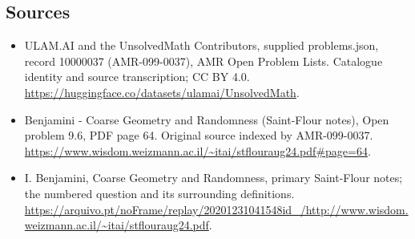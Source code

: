 \documentclass[11pt,a4paper]{article}
\begin{document}
\subsection{Sources}
\begin{itemize}
\item[S1] ULAM.AI and the UnsolvedMath Contributors, supplied problems.json, record 10000037 (AMR-099-0037), AMR Open Problem Lists. Catalogue identity and source transcription; CC BY 4.0.
\url{https://huggingface.co/datasets/ulamai/UnsolvedMath}.
\item[S2] Benjamini - Coarse Geometry and Randomness (Saint-Flour notes), Open problem 9.6, PDF page 64. Original source indexed by AMR-099-0037.
\url{https://www.wisdom.weizmann.ac.il/~itai/stflouraug24.pdf#page=64}.
\item[S3] I. Benjamini, Coarse Geometry and Randomness, primary Saint-Flour notes; the numbered question and its surrounding definitions.
\url{https://arquivo.pt/noFrame/replay/20201231041548id_/http://www.wisdom.weizmann.ac.il/~itai/stflouraug24.pdf}.
\end{itemize}
\end{document}
